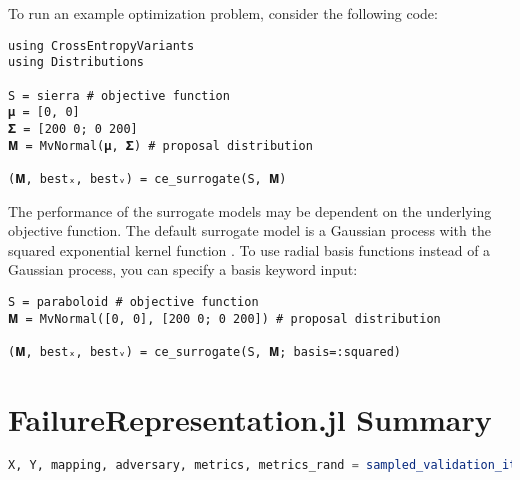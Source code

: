 To run an example optimization problem, consider the following code:

\begin{lstlisting}[language=JuliaLocal]
using CrossEntropyVariants
using Distributions

S = sierra # objective function
𝛍 = [0, 0]
𝚺 = [200 0; 0 200]
𝐌 = MvNormal(𝛍, 𝚺) # proposal distribution

(𝐌, bestₓ, bestᵥ) = ce_surrogate(S, 𝐌)
\end{lstlisting}

The performance of the surrogate models may be dependent on the underlying objective function. The default surrogate model is a Gaussian process with the squared exponential kernel function \cite{kochenderfer2019algorithms}. To use radial basis functions instead of a Gaussian process, you can specify a basis keyword input:

\begin{lstlisting}[language=JuliaLocal]
S = paraboloid # objective function
𝐌 = MvNormal([0, 0], [200 0; 0 200]) # proposal distribution

(𝐌, bestₓ, bestᵥ) = ce_surrogate(S, 𝐌; basis=:squared)
\end{lstlisting}


\section{FailureRepresentation.jl Summary}

\begin{lstlisting}[language=Julia]
X, Y, mapping, adversary, metrics, metrics_rand = sampled_validation_iteration(T=10)
\end{lstlisting}